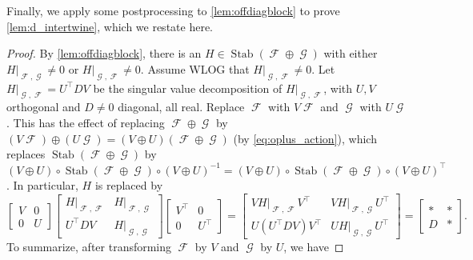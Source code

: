 \documentclass{article}
\DeclareMathOperator{\rr}{\mathbb{R}}
\DeclareMathOperator{\fc}{\mathcal{F}}
\DeclareMathOperator{\gc}{\mathcal{G}}
\DeclareMathOperator{\stab}{Stab}
\begin{document}
Finally, we apply some postprocessing to \autoref{lem:offdiagblock} to
prove \autoref{lem:d_intertwine}, which we restate here.
\intertwinelemma*
\begin{proof}
    By \autoref{lem:offdiagblock}, there is an $H \in \stab(\fc\oplus\gc)$
    with either $H|_{\fc,\gc} \neq 0$ or $H|_{\gc,\fc} \neq 0$. Assume WLOG that $H|_{\gc,\fc} \neq 0$.
    Let $H|_{\gc,\fc} = U^\top D V$ be the singular value decomposition of $H|_{\gc,\fc}$, with
    $U,V$ orthogonal and $D \neq 0$ diagonal, all real. 
    Replace $\fc$ with $V \fc$ and $\gc$ with $U \gc$.
    This has the effect of replacing $\fc \oplus \gc$ by
    $(V\fc)\oplus (U \gc) = (V \oplus U)(\fc \oplus \gc)$ (by \eqref{eq:oplus_action}),
    which replaces
    $\stab(\fc\oplus\gc)$ by $(V \oplus U) \circ \stab(\fc\oplus\gc) \circ 
    (V \oplus U)^{-1} = (V \oplus U) \circ \stab(\fc\oplus\gc) \circ 
    (V \oplus U)^\top$. In particular, $H$ is replaced by
    \[
        \begin{bmatrix} V & 0 \\ 0 & U \end{bmatrix} 
        \begin{bmatrix} H|_{\fc,\fc} & H|_{\fc,\gc} \\ U^\top DV & H|_{\gc,\gc} \end{bmatrix}
        \begin{bmatrix} V^\top & 0 \\ 0 & U^\top \end{bmatrix} =
        \begin{bmatrix} VH|_{\fc,\fc}V^\top & VH|_{\fc,\gc}U^\top \\ U(U^\top DV) V^\top & U H|_{\gc,\gc} U^\top \end{bmatrix}
        = \begin{bmatrix} * & * \\ D & * \end{bmatrix}.
    \]
    To summarize, after transforming $\fc$ by $V$ and $\gc$ by $U$, we have

\end{proof}
\end{document}
